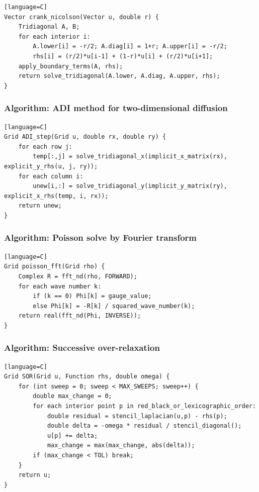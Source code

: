\documentclass[11pt]{article}
\begin{document}
\begin{verbatim}[language=C]
Vector crank_nicolson(Vector u, double r) {
    Tridiagonal A, B;
    for each interior i:
        A.lower[i] = -r/2; A.diag[i] = 1+r; A.upper[i] = -r/2;
        rhs[i] = (r/2)*u[i-1] + (1-r)*u[i] + (r/2)*u[i+1];
    apply_boundary_terms(A, rhs);
    return solve_tridiagonal(A.lower, A.diag, A.upper, rhs);
}
\end{verbatim}

\subsubsection{Algorithm: ADI method for two-dimensional diffusion}\label{algorithm-adi-method-for-two-dimensional-diffusion}

\begin{verbatim}[language=C]
Grid ADI_step(Grid u, double rx, double ry) {
    for each row j:
        temp[:,j] = solve_tridiagonal_x(implicit_x_matrix(rx), explicit_y_rhs(u, j, ry));
    for each column i:
        unew[i,:] = solve_tridiagonal_y(implicit_y_matrix(ry), explicit_x_rhs(temp, i, rx));
    return unew;
}
\end{verbatim}

\subsubsection{Algorithm: Poisson solve by Fourier transform}\label{algorithm-poisson-solve-by-fourier-transform}

\begin{verbatim}[language=C]
Grid poisson_fft(Grid rho) {
    Complex R = fft_nd(rho, FORWARD);
    for each wave number k:
        if (k == 0) Phi[k] = gauge_value;
        else Phi[k] = -R[k] / squared_wave_number(k);
    return real(fft_nd(Phi, INVERSE));
}
\end{verbatim}

\subsubsection{Algorithm: Successive over-relaxation}\label{algorithm-successive-over-relaxation}

\begin{verbatim}[language=C]
Grid SOR(Grid u, Function rhs, double omega) {
    for (int sweep = 0; sweep < MAX_SWEEPS; sweep++) {
        double max_change = 0;
        for each interior point p in red_black_or_lexicographic_order:
            double residual = stencil_laplacian(u,p) - rhs(p);
            double delta = -omega * residual / stencil_diagonal();
            u[p] += delta;
            max_change = max(max_change, abs(delta));
        if (max_change < TOL) break;
    }
    return u;
}
\end{verbatim}
\end{document}
